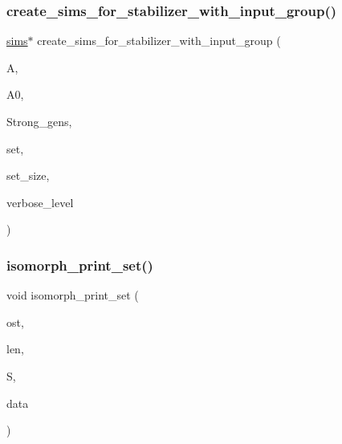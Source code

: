 \subsubsection{\texorpdfstring{create\+\_\+sims\+\_\+for\+\_\+stabilizer\+\_\+with\+\_\+input\+\_\+group()}{create\_sims\_for\_stabilizer\_with\_input\_group()}}
{\footnotesize\ttfamily \mbox{\hyperlink{classsims}{sims}}$\ast$ create\+\_\+sims\+\_\+for\+\_\+stabilizer\+\_\+with\+\_\+input\+\_\+group (\begin{DoxyParamCaption}\item[{\mbox{\hyperlink{classaction}{action}} $\ast$}]{A,  }\item[{\mbox{\hyperlink{classaction}{action}} $\ast$}]{A0,  }\item[{\mbox{\hyperlink{classstrong__generators}{strong\+\_\+generators}} $\ast$}]{Strong\+\_\+gens,  }\item[{\mbox{\hyperlink{galois_8h_a09fddde158a3a20bd2dcadb609de11dc}{I\+NT}} $\ast$}]{set,  }\item[{\mbox{\hyperlink{galois_8h_a09fddde158a3a20bd2dcadb609de11dc}{I\+NT}}}]{set\+\_\+size,  }\item[{\mbox{\hyperlink{galois_8h_a09fddde158a3a20bd2dcadb609de11dc}{I\+NT}}}]{verbose\+\_\+level }\end{DoxyParamCaption})}

\mbox{\label{extra_8_c_a31c112d9eb7e00d3856052d9debfda70}} 
\subsubsection{\texorpdfstring{isomorph\+\_\+print\+\_\+set()}{isomorph\_print\_set()}}
{\footnotesize\ttfamily void isomorph\+\_\+print\+\_\+set (\begin{DoxyParamCaption}\item[{ostream \&}]{ost,  }\item[{\mbox{\hyperlink{galois_8h_a09fddde158a3a20bd2dcadb609de11dc}{I\+NT}}}]{len,  }\item[{\mbox{\hyperlink{galois_8h_a09fddde158a3a20bd2dcadb609de11dc}{I\+NT}} $\ast$}]{S,  }\item[{void $\ast$}]{data }\end{DoxyParamCaption})}

\mbox{\label{extra_8_c_af08eebddb0a897485d9a29558f6169b0}} 
